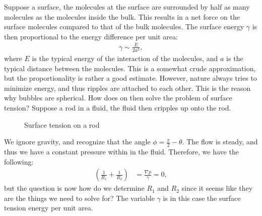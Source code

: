 \documentclass[a4paper]{article}
\begin{document}
\vspace*{0.5cm}\noindent
Suppose a surface, the molecules at the surface are surrounded by half as many molecules as the molecules inside the bulk. This results in a net force on the surface molecules compared to that of the bulk molecules.
The surface energy $\gamma$ is then proportional to the energy difference per unit area:
\begin{align*}
    \gamma\sim \frac{E}{2a^2},
\end{align*}where $E$ is the typical energy of the interaction of the molecules, and $a$ is the typical distance between the molecules.
This is a somewhat crude approximation, but the proportionality is rather a good estimate. However, nature always tries to minimize energy, and thus ripples are attached to each other. This is the reason why bubbles are spherical.
How does on then solve the problem of surface tension? Suppose a rod in a fluid, the fluid then cripples up onto the rod.
\begin{figure}[H]
    \centering
    \caption{Surface tension on a rod}
    \label{fig: Surface tension on a rod}
\end{figure}\noindent
We ignore gravity, and recognize that the angle $\phi = \frac{\pi}{2} -\theta$. The flow is steady, and thus we have a constant pressure within in the fluid.
Therefore, we have the following:
\begin{align*}
    \left(\frac{1}{R_1} + \frac{1}{R_2}\right) &= \frac{\nabla p}{\gamma} = 0,
\end{align*}but the question is now how do we determine $R_1$ and $R_2$ since it seems like they are the things we need to solve for? The variable $\gamma$ is in this case the surface tension energy per unit area.
\end{document}
